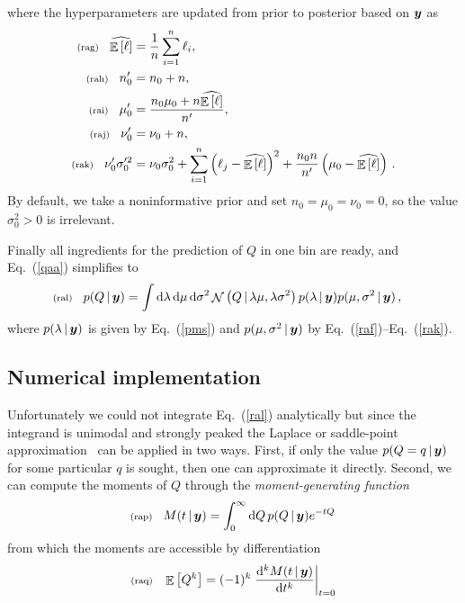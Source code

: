 \documentclass[11pt]{article}
\newcommand{\fredmargin}[1]{\todo[color=orange!40]{#1}} %
\newcommand{\lleq}[1]{\label{#1} }
\renewcommand{\lleq}[1]{\label{#1} {\scriptstyle {\rm (#1)}} \hspace*{2ex} }
\newcommand{\cond}{\,|\,}
\newcommand{\refeq}[1]{Eq.~(\ref{#1})}
\DeclareMathOperator{\Expect}{\mathbb{E}}
\newcommand{\expect}[1]{\Expect\left[#1\right]}
\newcommand{\expectest}[1]{\widehat{\Expect\left[#1\right]}}
\DeclareMathOperator{\GaussianDist}{\mathcal{N}}
\newcommand{\Lumtot}{Q}
\newcommand{\lumtot}{q}
\newcommand{\Lum}{L}
\newcommand{\lum}{\ell}
\newcommand{\rmdx}[1]{\dd{#1}} %
\begin{document}
where the hyperparameters are updated from prior to posterior based on ${\bm{y}}$ as
\begin{align}
  \lleq{rag}
  \expectest{\lum} &= \frac{1}{n} \sum_{i=1}^n \lum_i,\\
  \lleq{rah}  n_0^\prime &= n_0 + n,\\
  \lleq{rai}    \mu_0^\prime &= \frac{n_0 \mu_0 + n \expectest{\lum}}{n^\prime},\\
  \lleq{raj}    \nu_0^\prime &= \nu_0 + n,\\
  \lleq{rak}    \nu_0^\prime \sigma_0^{\prime 2} &= \nu_0 \sigma_0^{ 2} + \sum_{i=1}^n \left(\lum_j - \expectest{\lum}\right)^2 + \frac{n_0 n}{n^\prime} \left(\mu_0 - \expectest{\lum}\right)\,.
  \end{align}
  By default, we take a noninformative prior and set
  $n_0 = \mu_0 = \nu_0 = 0$, so the value $\sigma_0^2>0$ is
  irrelevant.

  Finally all ingredients for the prediction of $\Lumtot$ in one bin are
  ready, and \refeq{qaa} simplifies to
\begin{align}
  \lleq{ral}
  p(\Lumtot \cond \bmy) &= \int \rmdx{\lambda} \rmdx{\mu} \rmdx{\sigma^2} \GaussianDist \left( \Lumtot \cond \lambda \mu, \lambda \sigma^2 \right) p(\lambda \cond \bmy) p( \mu, \sigma^2 \cond \bmy) \,,
\end{align}
where $ p(\lambda \cond \bmy)$ is given by \refeq{pms} and
$ p( \mu, \sigma^2 \cond \bmy)$ by
\refeq{raf}--\refeq{rak}.

\subsection{Numerical implementation}\label{sec:asympt-numeric}

Unfortunately we could not integrate \refeq{ral} analytically but
since the integrand is unimodal and strongly peaked the Laplace or
saddle-point approximation~\cite[Ch. 27]{mackay2003information} can be
applied in two ways. First, if only the value
$p(\Lumtot=\lumtot \cond \bmy)$ for some particular $q$ is sought,
then one can approximate it directly. Second, we can compute the
moments of $\Lumtot$ through the \emph{moment-generating
  function}\fredmargin{ref}
\begin{align}
  \lleq{rap}
  M(t \cond \bmy) = \int_0^{\infty} \rmdx{\Lumtot} p(\Lumtot \cond \bmy) e^{-t \Lumtot} \,
\end{align}
from which the moments are accessible by differentiation
\begin{align}
  \lleq{raq}
  \expect{\Lumtot^k} = (-1)^k \eval{\dv[k]{M(t \cond \bmy)}{t}}_{t=0}
\end{align}
\end{document}
